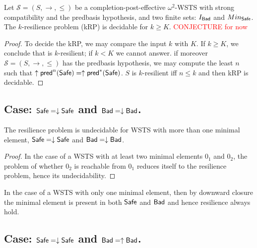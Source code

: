\begin{theorem}\label{k-down-up}
Let $\mathscr{S}=(S,\rightarrow, \leq)$ be a completion-post-effective $\omega^2$-WSTS with strong compatibility and the predbasis hypothesis, and two finite sets: $I_{\textsf{Bad}}$ and $Min_{\textsf{Safe}}$.
The  $k$-resilience problem (kRP) is decidable for $k \geq K$. \textcolor{red}{CONJECTURE for now}
 \end{theorem}

\begin{proof}
To decide the kRP, we may compare the input $k$ with $K$. If $k \geq K$, we conclude that is %
$k$-resilient; if $k < K$ we cannot answer. if moreover $\mathscr{S}=(S,\rightarrow, \leq)$ has the predbasis hypothesis, we may compute the least $n$ such that $ \uparrow \textsf{pred}^n(\textsf{Safe})=  \uparrow \textsf{pred}^*(\textsf{Safe})$. $S$ is %
 $k$-resilient iff $n \leq k$ and then kRP is decidable.
\end{proof}

%




\subsection{Case: $\textsf{Safe}=\downarrow \textsf{Safe}$ and $\textsf{Bad}=\downarrow \textsf{Bad}$.}


\begin{theorem}\label{down-down}
The resilience problem is undecidable for WSTS with more than one minimal element, 
$\textsf{Safe}=\downarrow \textsf{Safe}$
and $\textsf{Bad}=\downarrow \textsf{Bad}$.
\end{theorem}

\begin{proof}
In the case of a WSTS with at least two minimal elements $0_1$ and $0_2$, the problem of whether $0_2$ is reachable from $0_1$ reduces itself to the resilience problem, hence its undecidability.  
\end{proof}

In the case of a WSTS with only one minimal element,  
then by downward closure the minimal element is present in both $\textsf{Safe}$ and $\textsf{Bad}$ and hence resilience always hold.






\subsection{Case: $\textsf{Safe}=\downarrow \textsf{Safe}$ and $\textsf{Bad}=\uparrow \textsf{Bad}$.}
%
%

